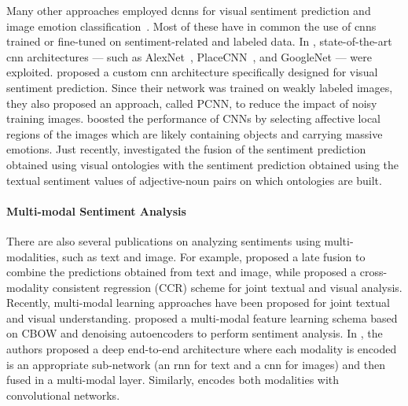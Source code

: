 Many other approaches employed \glspl{dcnn} for visual sentiment prediction and image emotion classification~\cite{campos2017pixels,chen2014deepsentibank,islam2016visual,rao2016learning,you2015robust,xu2014visual}.
Most of these have in common the use of \glspl{cnn} trained or fine-tuned on sentiment-related and labeled data.
In \cite{campos2017pixels,chen2014deepsentibank,islam2016visual,jou2015visual}, %
state-of-the-art \gls{cnn} architectures --- such as AlexNet~\cite{krizhevsky2012imagenet}, PlaceCNN~\cite{zhou2014learning}, and GoogleNet \cite{szegedy2015going} --- were exploited.
\citet{you2015robust} proposed a custom \gls{cnn} architecture specifically designed for visual sentiment prediction.
Since their network was trained on weakly labeled images, they also proposed an approach, called PCNN, to reduce the impact of noisy training images. %
\citet{sun2016discovering} boosted the performance of CNNs by selecting affective local regions of the images which are likely containing objects and carrying massive emotions. %
Just recently, \citet{li2018image} investigated the fusion of the sentiment prediction obtained using visual ontologies with the sentiment prediction obtained using the textual sentiment values of adjective-noun pairs on which ontologies are built.


\paragraph{Multi-modal Sentiment Analysis}
There are also several publications on analyzing sentiments using multi-modalities, such as text and image.
For example, \citet{cao2016cross} proposed a late fusion to combine the predictions obtained from text and image, while \citet{you2016cross} proposed a cross-modality consistent regression (CCR) scheme for joint textual and visual analysis.
Recently, multi-modal learning approaches have been proposed for joint textual and visual understanding.
\citet{baecchi2016multimodal} proposed a multi-modal feature learning schema based on CBOW and denoising autoencoders to perform sentiment analysis.
In \cite{mao2014deep}, the authors proposed a deep end-to-end architecture where each modality is encoded is an appropriate sub-network (an \gls{rnn} for text and a \gls{cnn} for images) and then fused in a multi-modal layer.
Similarly, \citet{ma2015multimodal} encodes both modalities with convolutional networks.


